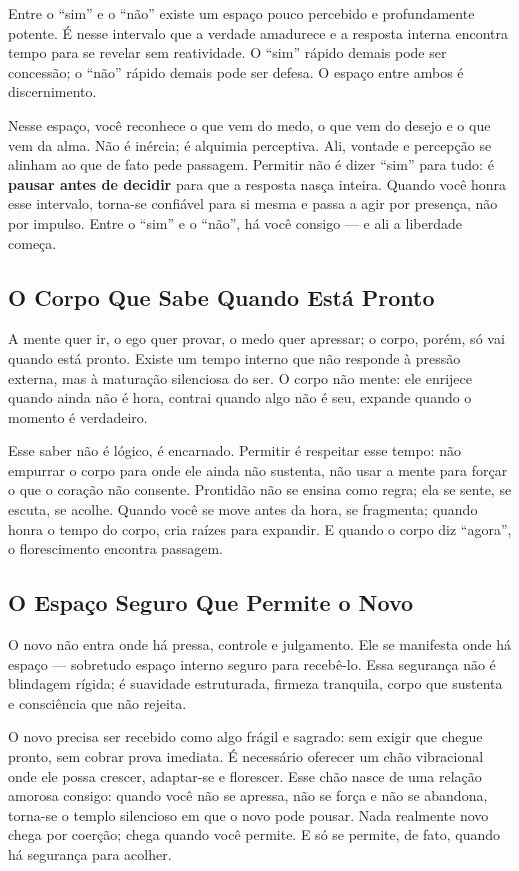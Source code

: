\documentclass[12pt]{book}
\begin{document}
Entre o \enquote{sim} e o \enquote{não} existe um espaço pouco percebido e profundamente potente. É nesse intervalo que a verdade amadurece e a resposta interna encontra tempo para se revelar sem reatividade. O \enquote{sim} rápido demais pode ser concessão; o \enquote{não} rápido demais pode ser defesa. O espaço entre ambos é discernimento.

Nesse espaço, você reconhece o que vem do medo, o que vem do desejo e o que vem da alma. Não é inércia; é alquimia perceptiva. Ali, vontade e percepção se alinham ao que de fato pede passagem. Permitir não é dizer \enquote{sim} para tudo: é \textbf{pausar antes de decidir} para que a resposta nasça inteira. Quando você honra esse intervalo, torna-se confiável para si mesma e passa a agir por presença, não por impulso. Entre o \enquote{sim} e o \enquote{não}, há você consigo — e ali a liberdade começa.

\subsection*{O Corpo Que Sabe Quando Está Pronto}

A mente quer ir, o ego quer provar, o medo quer apressar; o corpo, porém, só vai quando está pronto. Existe um tempo interno que não responde à pressão externa, mas à maturação silenciosa do ser. O corpo não mente: ele enrijece quando ainda não é hora, contrai quando algo não é seu, expande quando o momento é verdadeiro.

Esse saber não é lógico, é encarnado. Permitir é respeitar esse tempo: não empurrar o corpo para onde ele ainda não sustenta, não usar a mente para forçar o que o coração não consente. Prontidão não se ensina como regra; ela se sente, se escuta, se acolhe. Quando você se move antes da hora, se fragmenta; quando honra o tempo do corpo, cria raízes para expandir. E quando o corpo diz \enquote{agora}, o florescimento encontra passagem.

\subsection*{O Espaço Seguro Que Permite o Novo}

O novo não entra onde há pressa, controle e julgamento. Ele se manifesta onde há espaço — sobretudo espaço interno seguro para recebê-lo. Essa segurança não é blindagem rígida; é suavidade estruturada, firmeza tranquila, corpo que sustenta e consciência que não rejeita.

O novo precisa ser recebido como algo frágil e sagrado: sem exigir que chegue pronto, sem cobrar prova imediata. É necessário oferecer um chão vibracional onde ele possa crescer, adaptar-se e florescer. Esse chão nasce de uma relação amorosa consigo: quando você não se apressa, não se força e não se abandona, torna-se o templo silencioso em que o novo pode pousar. Nada realmente novo chega por coerção; chega quando você permite. E só se permite, de fato, quando há segurança para acolher.
\end{document}
